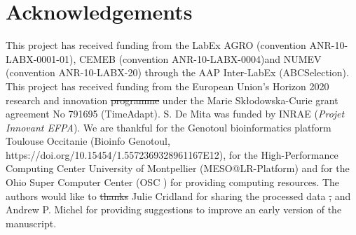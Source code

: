 \documentclass[a4paper, 12pt]{article}
\providecommand{\DIFaddtex}[1]{{\protect\color{blue}\uwave{#1}}} %
\providecommand{\DIFdeltex}[1]{{\protect\color{red}\sout{#1}}}                      %
\providecommand{\DIFaddbegin}{} %
\providecommand{\DIFaddend}{} %
\providecommand{\DIFdelbegin}{} %
\providecommand{\DIFdelend}{} %
\providecommand{\DIFadd}[1]{\texorpdfstring{\DIFaddtex{#1}}{#1}} %
\providecommand{\DIFdel}[1]{\texorpdfstring{\DIFdeltex{#1}}{}} %
\newcommand{\DIFscaledelfig}{0.5}
\newlength{\DIFdelgraphicswidth} %
\newlength{\DIFdelgraphicsheight} %
\newcommand{\DIFaddincludegraphics}[2][]{{\color{blue}\fbox{\DIFOincludegraphics[#1]{#2}}}} %
\newcommand{\DIFdelincludegraphics}[2][]{%
\sbox{\DIFdelgraphicsbox}{\DIFOincludegraphics[#1]{#2}}%
\settoboxwidth{\DIFdelgraphicswidth}{\DIFdelgraphicsbox} %
\settoboxtotalheight{\DIFdelgraphicsheight}{\DIFdelgraphicsbox} %
\scalebox{\DIFscaledelfig}{%
\parbox[b]{\DIFdelgraphicswidth}{\usebox{\DIFdelgraphicsbox}\\[-\baselineskip] \rule{\DIFdelgraphicswidth}{0em}}\llap{\resizebox{\DIFdelgraphicswidth}{\DIFdelgraphicsheight}{%
\setlength{\unitlength}{\DIFdelgraphicswidth}%
\begin{picture}(1,1)%
\thicklines\linethickness{2pt} %
{\color[rgb]{1,0,0}\put(0,0){\framebox(1,1){}}}%
{\color[rgb]{1,0,0}\put(0,0){\line( 1,1){1}}}%
{\color[rgb]{1,0,0}\put(0,1){\line(1,-1){1}}}%
\end{picture}%
}\hspace*{3pt}}} %
} %
\DeclareRobustCommand{\DIFaddbegin}{\DIFOaddbegin \let\includegraphics\DIFaddincludegraphics} %
\DeclareRobustCommand{\DIFaddend}{\DIFOaddend \let\includegraphics\DIFOincludegraphics} %
\DeclareRobustCommand{\DIFdelbegin}{\DIFOdelbegin \let\includegraphics\DIFdelincludegraphics} %
\DeclareRobustCommand{\DIFdelend}{\DIFOaddend \let\includegraphics\DIFOincludegraphics} %
\begin{document}
\DIFdelend \DIFaddbegin \DIFadd{.
}\DIFaddend \section*{Acknowledgements}

This project has received funding from the LabEx AGRO (convention ANR-10-LABX-0001-01), CEMEB (convention ANR-10-LABX-0004)\DIFaddbegin \DIFadd{, }\DIFaddend and NUMEV (convention ANR-10-LABX-20) through the AAP Inter-LabEx (ABCSelection). This project has received funding from the European Union's Horizon 2020 research and innovation \DIFdelbegin \DIFdel{programme }\DIFdelend \DIFaddbegin \DIFadd{program }\DIFaddend under the Marie Skłodowska-Curie grant agreement No 791695 (TimeAdapt). S. De Mita was funded by INRAE (\textit{Projet Innovant EFPA}). We are thankful for the Genotoul bioinformatics platform Toulouse Occitanie (Bioinfo Genotoul, https://doi.org/10.15454/1.5572369328961167E12), for the High-Performance Computing Center University of Montpellier (MESO@LR-Platform) and for the Ohio Super Computer Center (OSC \citet{OhioSupercomputerCenter1987}) for providing computing resources. The authors would like to \DIFdelbegin \DIFdel{thanks }\DIFdelend \DIFaddbegin \DIFadd{thank }\DIFaddend Julie Cridland for sharing the processed data \DIFdelbegin \DIFdel{, }\DIFdelend and Andrew P. Michel for providing suggestions to improve an early version of the manuscript. 



\end{document}
